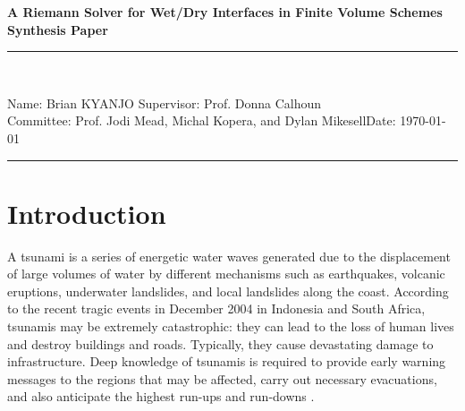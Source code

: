 \documentclass[9pt,a4paper]{article}
\newcommand{\student}{Brian KYANJO }
\newcommand{\course}{Prof. Jodi Mead, Michal Kopera, and Dylan Mikesell}
\newcommand{\assignment}{ Prof. Donna Calhoun}
\begin{document}
	
	\thispagestyle{empty}
	\begin{center}
		\textbf{A Riemann Solver for Wet/Dry Interfaces in Finite Volume Schemes\\[0.5cm]
			Synthesis Paper}
		\vspace{.2cm}
	\end{center}
	
	
	\begin{center}
		\rule{17cm}{0.2cm}\\[0.3cm]
	\end{center}	
	
	\noindent	Name: \student \hfill Supervisor: \assignment\\[0.1cm]
	Committee: \course \hfill Date: \today\\
	\rule{17cm}{0.05cm}
	\vspace{.2cm}
	
	\section{Introduction}
	
	A tsunami is a series of energetic water waves generated due to the displacement of large volumes of water by different mechanisms such as earthquakes, volcanic eruptions, underwater landslides, and local landslides along the coast. According to the recent tragic events in December 2004 in Indonesia and  South Africa, tsunamis may be extremely catastrophic: they can lead to the loss of human lives and destroy buildings and roads. Typically, they cause devastating damage to infrastructure. Deep knowledge of tsunamis is required to provide early warning messages to the regions that may be affected, carry out necessary evacuations, and also anticipate the highest run-ups and run-downs  \citep{sanchez2016uncertainty, dutykh2007water,dias2007dynamics}.
	
\end{document}

